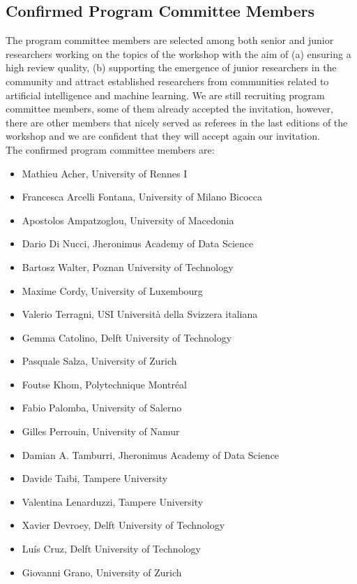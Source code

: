 \subsection{Confirmed Program Committee Members}
The program committee members are selected among both senior and junior researchers working on the topics of the workshop with the aim of (a) ensuring a high review quality, (b) supporting the emergence of junior researchers in the community and attract established researchers from communities related to artificial intelligence and machine learning.
We are still recruiting program committee members, some of them already accepted the invitation, however, there are other members that nicely served as referees in the last editions of the workshop and we are confident that they will accept again our invitation.\\
The confirmed program committee members are:
\begin{itemize}[itemsep=0.5em]
	
	\item Mathieu Acher, University of Rennes I
	\item Francesca Arcelli Fontana, University of  Milano Bicocca
	\item Apostolos Ampatzoglou, University of Macedonia
	\item Dario Di Nucci, Jheronimus Academy of Data Science
	\item Bartosz Walter, Poznan University of Technology
	\item Maxime Cordy, University of Luxembourg
	\item Valerio Terragni, USI Università della Svizzera italiana
	\item Gemma Catolino, Delft University of Technology
	\item Pasquale Salza, University of Zurich
	\item Foutse Khom, Polytechnique Montréal
	\item Fabio Palomba, University of Salerno
	\item Gilles Perrouin, University of Namur
	\item Damian A. Tamburri, Jheronimus Academy of Data Science
	\item Davide Taibi, Tampere University
	\item Valentina Lenarduzzi, Tampere University
	\item Xavier Devroey, Delft University of Technology
	\item Luís Cruz, Delft University of Technology
	\item Giovanni Grano, University of Zurich
    
	
\end{itemize}
	
